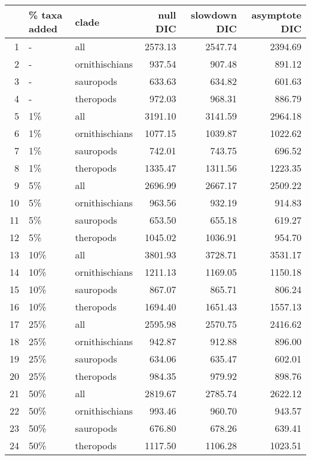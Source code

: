 \begin{table}[ht]
\centering
\begin{tabular}{rllrrr}
  \hline
 & \% taxa added & clade & null DIC & slowdown DIC & asymptote DIC \\ 
  \hline
1 & - & all & 2573.13 & 2547.74 & 2394.69 \\ 
  2 & - & ornithischians & 937.54 & 907.48 & 891.12 \\ 
  3 & - & sauropods & 633.63 & 634.82 & 601.63 \\ 
  4 & - & theropods & 972.03 & 968.31 & 886.79 \\ 
  5 & 1\% & all & 3191.10 & 3141.59 & 2964.18 \\ 
  6 & 1\% & ornithischians & 1077.15 & 1039.87 & 1022.62 \\ 
  7 & 1\% & sauropods & 742.01 & 743.75 & 696.52 \\ 
  8 & 1\% & theropods & 1335.47 & 1311.56 & 1223.35 \\ 
  9 & 5\% & all & 2696.99 & 2667.17 & 2509.22 \\ 
  10 & 5\% & ornithischians & 963.56 & 932.19 & 914.83 \\ 
  11 & 5\% & sauropods & 653.50 & 655.18 & 619.27 \\ 
  12 & 5\% & theropods & 1045.02 & 1036.91 & 954.70 \\ 
  13 & 10\% & all & 3801.93 & 3728.71 & 3531.17 \\ 
  14 & 10\% & ornithischians & 1211.13 & 1169.05 & 1150.18 \\ 
  15 & 10\% & sauropods & 867.07 & 865.71 & 806.24 \\ 
  16 & 10\% & theropods & 1694.40 & 1651.43 & 1557.13 \\ 
  17 & 25\% & all & 2595.98 & 2570.75 & 2416.62 \\ 
  18 & 25\% & ornithischians & 942.87 & 912.88 & 896.00 \\ 
  19 & 25\% & sauropods & 634.06 & 635.47 & 602.01 \\ 
  20 & 25\% & theropods & 984.35 & 979.92 & 898.76 \\ 
  21 & 50\% & all & 2819.67 & 2785.74 & 2622.12 \\ 
  22 & 50\% & ornithischians & 993.46 & 960.70 & 943.57 \\ 
  23 & 50\% & sauropods & 676.80 & 678.26 & 639.41 \\ 
  24 & 50\% & theropods & 1117.50 & 1106.28 & 1023.51 \\ 
   \hline
\end{tabular}
\caption{} 
\end{table}
